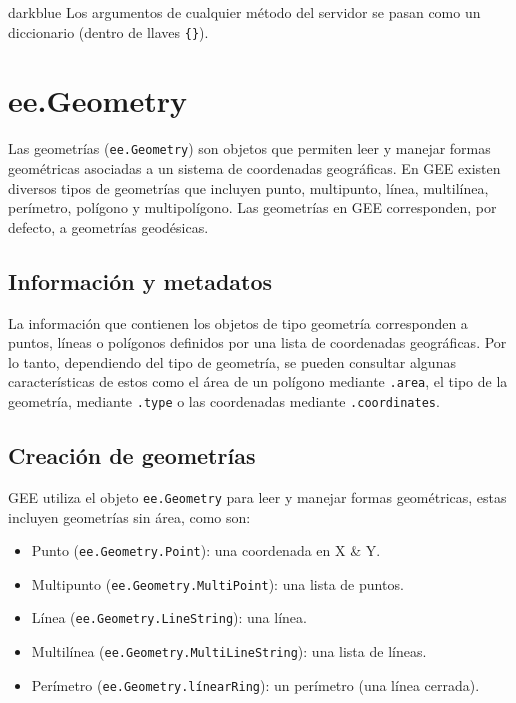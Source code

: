 \documentclass[
  12pt,
  letterpaper,
  twoside]{book}
\providecommand{\tightlist}{%
  \setlength{\itemsep}{0pt}\setlength{\parskip}{0pt}}
\begin{document}
\begin{bluebox2}

\begin{awesomeblock}{5pt}{\faLightbulb}{darkblue}
Los argumentos de cualquier método del servidor se pasan como un diccionario (dentro de llaves \texttt{\{\}}).

\end{awesomeblock}

\end{bluebox2}

\newpage

\hypertarget{ee.geometry-1}{%
\chapter{ee.Geometry}\label{ee.geometry-1}}

Las geometrías (\texttt{ee.Geometry}) son objetos que permiten leer y manejar formas geométricas asociadas a un sistema de coordenadas geográficas. En GEE existen diversos tipos de geometrías que incluyen punto, multipunto, línea, multilínea, perímetro, polígono y multipolígono. Las geometrías en GEE corresponden, por defecto, a geometrías geodésicas.

\hypertarget{informaciuxf3n-y-metadatos}{%
\section{Información y metadatos}\label{informaciuxf3n-y-metadatos}}

La información que contienen los objetos de tipo geometría corresponden a puntos, líneas o polígonos definidos por una lista de coordenadas geográficas. Por lo tanto, dependiendo del tipo de geometría, se pueden consultar algunas características de estos como el área de un polígono mediante \texttt{.area}, el tipo de la geometría, mediante \texttt{.type} o las coordenadas mediante \texttt{.coordinates}.

\hypertarget{creaciuxf3n-de-geometruxedas}{%
\section{Creación de geometrías}\label{creaciuxf3n-de-geometruxedas}}

GEE utiliza el objeto \texttt{ee.Geometry} para leer y manejar formas geométricas, estas incluyen geometrías sin área, como son:

\begin{itemize}
\tightlist
\item
  Punto (\texttt{ee.Geometry.Point}): una coordenada en X \& Y.
\item
  Multipunto (\texttt{ee.Geometry.MultiPoint}): una lista de puntos.
\item
  Línea (\texttt{ee.Geometry.LineString}): una línea.
\item
  Multilínea (\texttt{ee.Geometry.MultiLineString}): una lista de líneas.
\item
  Perímetro (\texttt{ee.Geometry.línearRing}): un perímetro (una línea cerrada).
\end{itemize}
\end{document}
